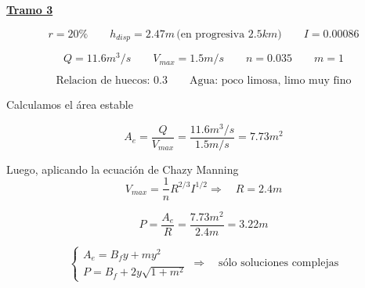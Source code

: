 \underline{\bf Tramo 3}

\begin{equation*}
  r = 20\%
 \qquad
  h_{disp} = 2.47 m \,\text{(en progresiva }2.5 km \text{)}
 \qquad
  I = 0.00086
\end{equation*}

\begin{equation*}
  Q = 11.6 m^3/s
 \qquad
  V_{max} = 1.5 m/s
 \qquad
  n = 0.035
 \qquad
  m = 1
\end{equation*}

\begin{equation*}
  \text{Relacion de huecos: 0.3}
  \qquad
  \text{Agua: poco limosa, limo muy fino}
\end{equation*}

Calculamos el área estable

\begin{equation*}
 A_{e} = \dfrac{Q}{V_{max}} = \dfrac{11.6 m^3/s}{1.5 m/s} = 7.73 m^2
\end{equation*}

Luego, aplicando la ecuación de Chazy Manning
\begin{equation*}
 V_{max} =  \frac{1}{n} R^{2/3} I^{1/2}
 \Longrightarrow \quad
 R = 2.4 m
\end{equation*}

\begin{equation*}
 P = \dfrac{A_{e}}{R} = \dfrac{7.73 m^2}{2.4 m} = 3.22 m
\end{equation*}

\begin{equation*}
  \begin{cases}
    A_e = B_{f}y + m y^{2} \\
    P = B_{f} + 2 y \sqrt{1 + m^{2}}
  \end{cases}
  \Longrightarrow \quad
  \text{sólo soluciones complejas}
\end{equation*}
